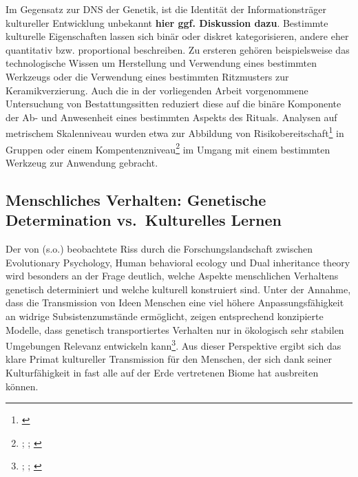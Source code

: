 \documentclass[openany,twoside,twocolumn]{book}
\let\rmarkdownfootnote\footnote%
\def\footnote{\protect\rmarkdownfootnote}
\begin{document}
Im Gegensatz zur DNS der Genetik, ist die Identität der
Informationsträger kultureller Entwicklung unbekannt \textbf{hier ggf.
Diskussion dazu}. Bestimmte kulturelle Eigenschaften lassen sich binär
oder diskret kategorisieren, andere eher quantitativ bzw. proportional
beschreiben. Zu ersteren gehören beispielsweise das technologische
Wissen um Herstellung und Verwendung eines bestimmten Werkzeugs oder die
Verwendung eines bestimmten Ritzmusters zur Keramikverzierung. Auch die
in der vorliegenden Arbeit vorgenommene Untersuchung von
Bestattungssitten reduziert diese auf die binäre Komponente der Ab- und
Anwesenheit eines bestimmten Aspekts des Rituals. Analysen auf
metrischem Skalenniveau wurden etwa zur Abbildung von
Risikobereitschaft\footnote{\textcite{bisin_economics_2001-1}} in
Gruppen oder einem Kompentenzniveau\footnote{\textcite{baldini_revisiting_2015};
  \textcite{henrich_demography_2004};
  \textcite{kobayashi_innovativeness_2012}} im Umgang mit einem
bestimmten Werkzeug zur Anwendung gebracht.

\hypertarget{menschliches-verhalten-genetische-determination-vs.kulturelles-lernen}{%
\subsection{Menschliches Verhalten: Genetische Determination
vs.~Kulturelles
Lernen}\label{menschliches-verhalten-genetische-determination-vs.kulturelles-lernen}}

Der von \autocite{smith_three_2000} (s.o.) beobachtete Riss durch die
Forschungslandschaft zwischen Evolutionary Psychology, Human behavioral
ecology und Dual inheritance theory wird besonders an der Frage
deutlich, welche Aspekte menschlichen Verhaltens genetisch determiniert
und welche kulturell konstruiert sind. Unter der Annahme, dass die
Transmission von Ideen Menschen eine viel höhere Anpassungsfähigkeit an
widrige Subsistenzumstände ermöglicht, zeigen entsprechend konzipierte
Modelle, dass genetisch transportiertes Verhalten nur in ökologisch sehr
stabilen Umgebungen Relevanz entwickeln kann\footnote{\textcite{aoki_emergence_2005};
  \textcite{aoki_evolution_2014}; \textcite{boyd_cultural_1983}}. Aus
dieser Perspektive ergibt sich das klare Primat kultureller Transmission
für den Menschen, der sich dank seiner Kulturfähigkeit in fast alle auf
der Erde vertretenen Biome hat ausbreiten können.
\end{document}
